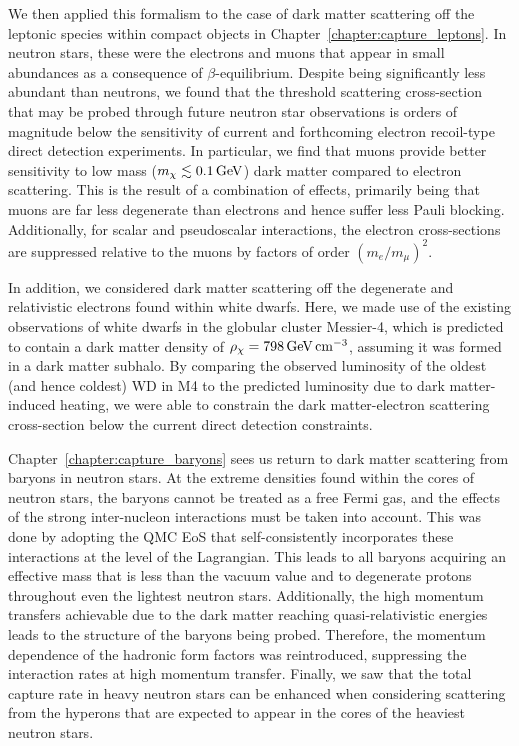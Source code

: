We then applied this formalism to the case of dark matter scattering off the leptonic species within compact objects in Chapter~\ref{chapter:capture_leptons}. In neutron stars, these were the electrons and muons that appear in small abundances as a consequence of $\beta$-equilibrium. Despite being significantly less abundant than neutrons, we found that the threshold scattering cross-section that may be probed through future neutron star observations is orders of magnitude below the sensitivity of current and forthcoming electron recoil-type direct detection experiments.
In particular, we find that muons provide better sensitivity to low mass ($m_\chi\lesssim 0.1{\rm \,GeV}$) dark matter compared to electron scattering. This is the result of a combination of effects, primarily being that muons are far less degenerate than electrons and hence suffer less Pauli blocking. Additionally, for scalar and pseudoscalar interactions, the electron cross-sections are suppressed relative to the muons by factors of order  $(m_e/m_\mu)^2$. 

In addition, we considered dark matter scattering off the degenerate and relativistic electrons found within white dwarfs.  Here, we made use of the existing observations of white dwarfs in the globular cluster Messier-4, which is predicted to contain a dark matter density of $\rho_\chi = 798{\rm \,GeV} {\rm \,cm}^{-3}$, assuming it was formed in a dark matter subhalo. By comparing the observed luminosity of the oldest (and hence coldest) WD in M4 to the predicted luminosity due to dark matter-induced heating, we were able to constrain the dark matter-electron scattering cross-section below the current direct detection constraints. 

Chapter~\ref{chapter:capture_baryons} sees us return to dark matter scattering from baryons in neutron stars. At the extreme densities found within the cores of neutron stars, the baryons cannot be treated as a free Fermi gas, and the effects of the strong inter-nucleon interactions must be taken into account. This was done by adopting the QMC EoS that self-consistently incorporates these interactions at the level of the Lagrangian. This leads to all baryons acquiring an effective mass that is less than the vacuum value and to degenerate protons throughout even the lightest neutron stars. Additionally, the high momentum transfers achievable due to the dark matter reaching quasi-relativistic energies leads to the structure of the baryons being probed. Therefore, the momentum dependence of the hadronic form factors was reintroduced, suppressing the interaction rates at high momentum transfer. Finally, we saw that the total capture rate in heavy neutron stars can be enhanced when considering scattering from the hyperons that are expected to appear in the cores of the heaviest neutron stars. 

